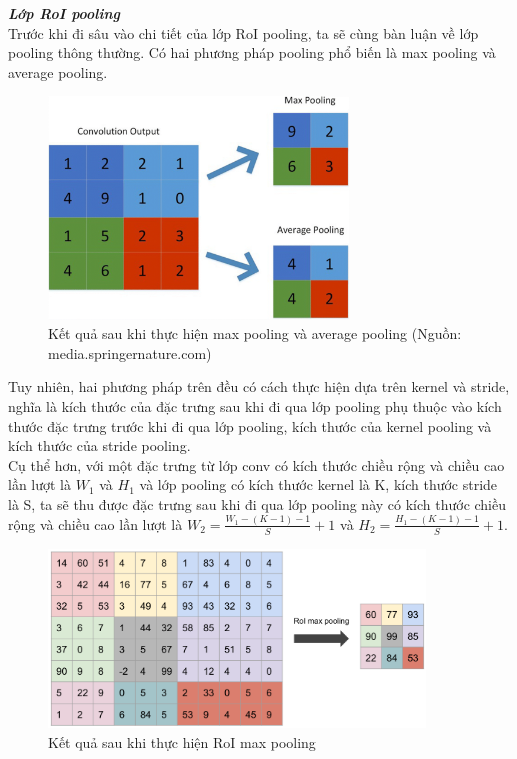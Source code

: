 {    \textbf{\textit{Lớp RoI pooling}} \\
    Trước khi đi sâu vào chi tiết của lớp RoI pooling, ta sẽ cùng bàn luận về lớp pooling thông thường.
    Có hai phương pháp pooling phổ biến là max pooling và average pooling.
    \begin{figure}[H]
        \centering
        \includegraphics[width=8cm] {images/pooling}
        \caption{Kết quả sau khi thực hiện max pooling và average pooling (Nguồn: media.springernature.com)}
        \label{fig:pooling}
    \end{figure}

    \noindent
    Tuy nhiên, hai phương pháp trên đều có cách thực hiện dựa trên kernel và stride, nghĩa là kích thước của đặc trưng sau khi đi qua lớp pooling phụ thuộc vào kích thước đặc trưng trước khi đi qua lớp pooling, kích thước của kernel pooling và kích thước của stride pooling. \\
    Cụ thể hơn, với một đặc trưng từ lớp conv có kích thước chiều rộng và chiều cao lần lượt là ${W}_{1}$ và ${H}_{1}$ và lớp pooling có kích thước kernel là K, kích thước stride là S, ta sẽ thu được đặc trưng sau khi đi qua lớp pooling này có kích thước chiều rộng và chiều cao lần lượt là ${W}_{2} = \frac{{W}_{1} - (K - 1) - 1}{S} + 1$ và ${H}_{2} = \frac{{H}_{1} - (K - 1) - 1}{S} + 1$.

    \begin{figure}[H]
        \centering
        \includegraphics[width=10cm] {images/roi_pooling}
        \caption{Kết quả sau khi thực hiện RoI max pooling}
        \label{fig:roi_pooling}
    \end{figure}

}
